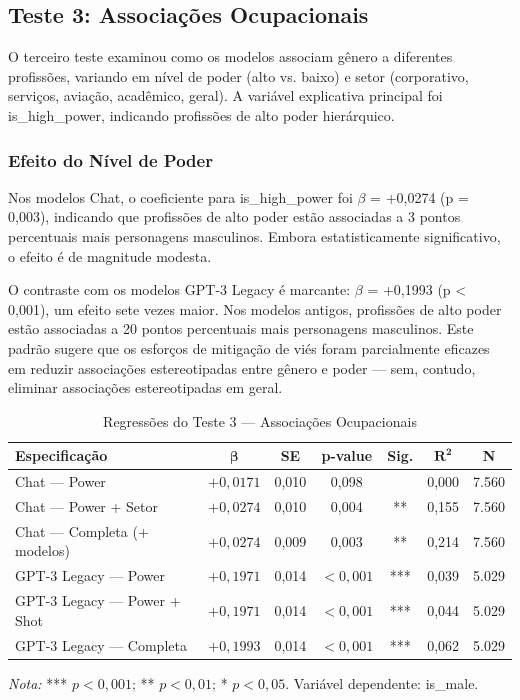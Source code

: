 \documentclass[12pt,a4paper]{article}
\begin{document}
\subsection{Teste 3: Associações Ocupacionais}


O terceiro teste examinou como os modelos associam gênero a diferentes
profissões, variando em nível de poder (alto vs. baixo) e setor
(corporativo, serviços, aviação, acadêmico, geral). A variável
explicativa principal foi is\_high\_power, indicando profissões de alto
poder hierárquico.


\subsubsection{Efeito do Nível de Poder}


Nos modelos Chat, o coeficiente para is\_high\_power foi $\beta$ = +0,0274 (p =
0,003), indicando que profissões de alto poder estão associadas a 3
pontos percentuais mais personagens masculinos. Embora estatisticamente
significativo, o efeito é de magnitude modesta.

O contraste com os modelos GPT-3 Legacy é marcante: $\beta$ = +0,1993 (p <
0,001), um efeito sete vezes maior. Nos modelos antigos, profissões de
alto poder estão associadas a 20 pontos percentuais mais personagens
masculinos. Este padrão sugere que os esforços de mitigação de viés
foram parcialmente eficazes em reduzir associações estereotipadas entre
gênero e poder --- sem, contudo, eliminar associações estereotipadas em
geral.

\begin{table}[H]
\centering
\caption{Regressões do Teste 3 --- Associações Ocupacionais}
\label{tab:reg-teste3}
\begin{tabular}{lcccccc}
\toprule
\textbf{Especificação} & $\boldsymbol{\beta}$ & \textbf{SE} & \textbf{p-value} & \textbf{Sig.} & $\boldsymbol{R^2}$ & \textbf{N} \\
\midrule
Chat --- Power & $+0,0171$ & 0,010 & 0,098 & & 0,000 & 7.560 \\
Chat --- Power + Setor & $+0,0274$ & 0,010 & 0,004 & ** & 0,155 & 7.560 \\
Chat --- Completa (+ modelos) & $+0,0274$ & 0,009 & 0,003 & ** & 0,214 & 7.560 \\
GPT-3 Legacy --- Power & $+0,1971$ & 0,014 & $<0,001$ & *** & 0,039 & 5.029 \\
GPT-3 Legacy --- Power + Shot & $+0,1971$ & 0,014 & $<0,001$ & *** & 0,044 & 5.029 \\
GPT-3 Legacy --- Completa & $+0,1993$ & 0,014 & $<0,001$ & *** & 0,062 & 5.029 \\
\bottomrule
\end{tabular}

\smallskip
\footnotesize\textit{Nota:} *** $p < 0,001$; ** $p < 0,01$; * $p < 0,05$. Variável dependente: is\_male.
\end{table}
\end{document}
